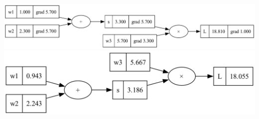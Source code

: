\begin{solution*}{}{}
\begin{center}
\includegraphics[width=\textwidth]{../figs/ex_backprop_before.png}
\includegraphics[width=\textwidth]{../figs/ex_backprop_after.png}
\end{center}
\end{solution*}
